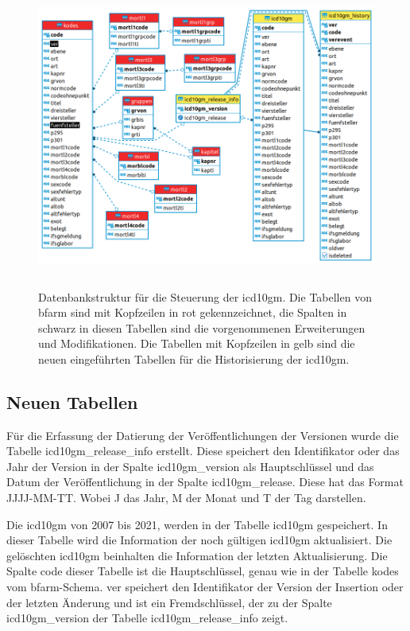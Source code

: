 \clearpage	
\begin{figure}[ht]
	\centering
	\includegraphics[height=10cm]{figures/icdSqlSchema}
	\caption[Datenbankstruktur]{Datenbankstruktur für die Steuerung der \ac{icd10gm}. Die Tabellen von \ac{bfarm} sind mit Kopfzeilen in rot gekennzeichnet, die Spalten in schwarz in diesen Tabellen sind die vorgenommenen Erweiterungen und Modifikationen. Die Tabellen mit Kopfzeilen in gelb sind die neuen eingeführten Tabellen für die Historisierung der \ac{icd10gm}.}
	\label{fig:reldb2}
\end{figure}

\subsection{Neuen Tabellen} \label{subsec:newtables}

Für die Erfassung der Datierung der Veröffentlichungen der Versionen wurde die Tabelle \textsf{icd10gm\_release\_info} erstellt. Diese speichert den Identifikator oder das Jahr der Version in der Spalte \textsf{icd10gm\_version} als Hauptschlüssel und das Datum der Veröffentlichung in der Spalte \textsf{icd10gm\_release}. Diese hat das Format \textsf{JJJJ-MM-TT}. Wobei J das Jahr, M der Monat und T der Tag darstellen.

Die \ac{icd10gm} von 2007 bis 2021, werden in der Tabelle \textsf{icd10gm} gespeichert. In dieser Tabelle wird die Information der noch gültigen \ac{icd10gm} aktualisiert. Die gelöschten \ac{icd10gm} beinhalten die Information der letzten Aktualisierung. Die Spalte \textsf{code} dieser Tabelle ist die Hauptschlüssel, genau wie in der Tabelle \textsf{kodes} vom \ac{bfarm}-Schema. \textsf{ver} speichert den Identifikator der Version der Insertion oder der letzten Änderung und ist ein Fremdschlüssel, der zu der Spalte \textsf{icd10gm\_version} der Tabelle \textsf{icd10gm\_release\_info} zeigt.

